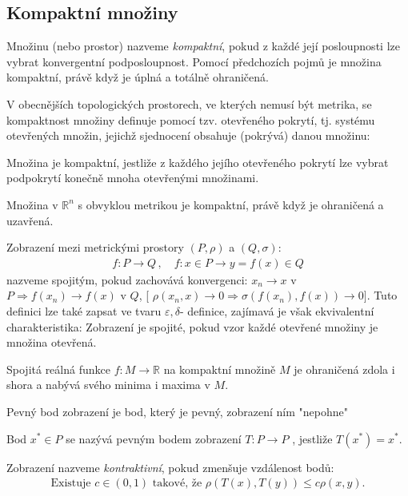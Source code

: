 \subsection{Kompaktní množiny}
\begin{definition}
Množinu (nebo prostor) nazveme \textit{kompaktní}, pokud z každé její posloupnosti lze vybrat konvergentní podposloupnost. Pomocí předchozích pojmů je množina kompaktní, právě když je úplná a totálně ohraničená. 
\end{definition}
V obecnějších topologických prostorech, ve
kterých nemusí být metrika, se kompaktnost množiny definuje pomocí tzv. otevřeného
pokrytí, tj. systému otevřených množin, jejichž sjednocení obsahuje (pokrývá) danou množinu:
\begin{definition}
Množina je kompaktní, jestliže z každého jejího otevřeného pokrytí lze vybrat podpokrytí konečně mnoha otevřenými množinami.
\end{definition}
Množina v $\mathbb{R}^n$ s obvyklou metrikou je kompaktní, právě když je ohraničená a uzavřená.
\begin{definition}
Zobrazení mezi metrickými prostory $(P,\rho)$ a $(Q, \sigma)$:
\begin{align*}
f: P\rightarrow Q\,, \quad f: x\in P\rightarrow y=f(x)\in Q
\end{align*}
nazveme spojitým, pokud zachovává konvergenci:
$x_n\rightarrow x$ v $P \Rightarrow f(x_n)\rightarrow f(x)$ v $Q$, [ $\rho(x_n, x)\rightarrow 0\Rightarrow \sigma(f(x_n), f(x))\rightarrow 0]$.
Tuto definici lze také zapsat ve tvaru $\varepsilon, \delta$- definice, zajímavá je však ekvivalentní charakteristika: Zobrazení je spojité, pokud vzor každé otevřené množiny je množina otevřená.
\end{definition}
Spojitá reálná funkce $f: M \rightarrow \mathbb{R}$ na kompaktní množině $M$ je ohraničená zdola i shora a nabývá svého minima i maxima v $M$.


Pevný bod zobrazení je bod, který je pevný, zobrazení ním "nepohne"
\begin{definition}
Bod $x^* \in P$ se nazývá pevným bodem zobrazení $T:P\rightarrow P$ , jestliže $T(x^*)=x^*$.
\end{definition}

Zobrazení nazveme \textit{kontraktivní}, pokud zmenšuje vzdálenost bodů:
\begin{align*}
\text{Existuje } c\in (0,1) \text{ takové, že } \rho(T(x), T(y))\leq c\rho(x, y).
\end{align*}

